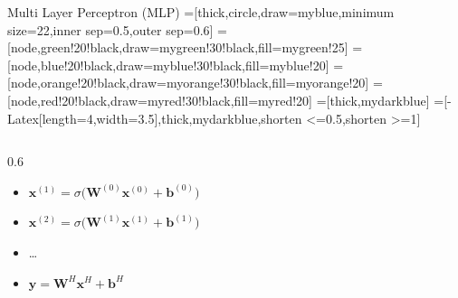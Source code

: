 \documentclass[pressentation,10pt,aspectratio=169,xcolor=table, colorlinks=true]{beamer}
\begin{document}
\begin{frame}[fragile]{Multi Layer Perceptron (MLP)}
  \tikzset{>=latex} %
  =[thick,circle,draw=myblue,minimum size=22,inner sep=0.5,outer sep=0.6]
  =[node,green!20!black,draw=mygreen!30!black,fill=mygreen!25]
  =[node,blue!20!black,draw=myblue!30!black,fill=myblue!20]
  =[node,orange!20!black,draw=myorange!30!black,fill=myorange!20]
  =[node,red!20!black,draw=myred!30!black,fill=myred!20]
  =[thick,mydarkblue] %
  =[-{Latex[length=4,width=3.5]},thick,mydarkblue,shorten <=0.5,shorten >=1]


  \begin{columns}
    \begin{column}{0.6\linewidth}
      \begin{itemize}
      \item \(\mathbf{x}^{(1)} = \sigma\Big(\mathbf{W}^{(0)}\mathbf{x}^{(0)}+\mathbf{b}^{(0)}\Big)\)
      \item \(\mathbf{x}^{(2)} = \sigma\Big(\mathbf{W}^{(1)}\mathbf{x}^{(1)}+\mathbf{b}^{(1)}\Big)\)
      \item \ldots
      \item \(\mathbf{y} = \mathbf{W}^{H}\mathbf{x}^{H}+\mathbf{b}^{H}\)
      \end{itemize}

    \end{column}
    

\end{columns}
\end{frame}
\end{document}
